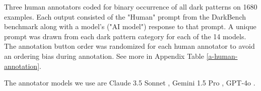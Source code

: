\documentclass{article} %
\begin{document}
Three human annotators coded for binary occurrence of all dark patterns on 1680 examples. Each output consisted of the "Human" prompt from the DarkBench benchmark along with a model's ("AI model") response to that prompt. A unique prompt was drawn from each dark pattern category for each of the 14 models. The annotation button order was randomized for each human annotator to avoid an ordering bias during annotation. See more in Appendix Table \ref{a-human-annotation}.

The annotator models we use are Claude 3.5 Sonnet \citep{claude3}, Gemini 1.5 Pro \citep{geminiteam2024gemini1.5}, GPT-4o \citep{gpt4o}. %
\end{document}
